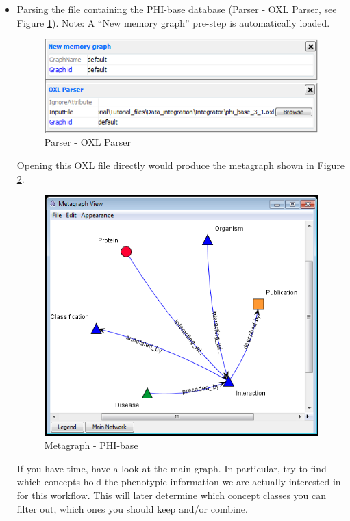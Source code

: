 \begin{itemize}
\item Parsing the file containing the PHI-base database (Parser - OXL Parser, see Figure \ref{fig:integrator_oxlimport}). 
Note: A ``New memory graph'' pre-step is automatically loaded.
\begin{figure}[H]
\centering
\includegraphics[scale=0.6]{images/Oct12/oxlimport.png} 
\caption{Parser - OXL Parser}
\label{fig:integrator_oxlimport}
\end{figure}
Opening this OXL file directly would produce the metagraph shown in Figure \ref{fig:metagraph_phibase}.
\begin{figure}[H]
\centering
\includegraphics[scale=0.6]{images/Oct12/phibase.png} 
\caption{Metagraph - PHI-base}
\label{fig:metagraph_phibase}
\end{figure}
If you have time, have a look at the main graph. 
In particular, try to find which concepts hold the phenotypic information we are actually interested in for this workflow.
This will later determine which concept classes you can filter out, which ones you should keep and/or combine.


\end{itemize}
